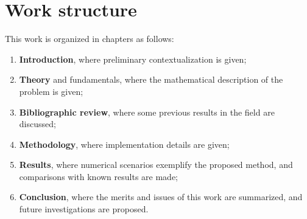 

\section{Work structure}

This work is organized in chapters as follows:
\begin{enumerate}
    \item \textbf{Introduction}, where preliminary contextualization is given;
    \item \textbf{Theory} and fundamentals, where the mathematical description of the problem is given;
    \item \textbf{Bibliographic review}, where some previous results in the field are discussed;
    \item \textbf{Methodology}, where implementation details are given;
    \item \textbf{Results}, where numerical scenarios exemplify the proposed method, and comparisons with known results are made;
    \item \textbf{Conclusion}, where the merits and issues of this work are summarized, and future investigations are proposed.
\end{enumerate}